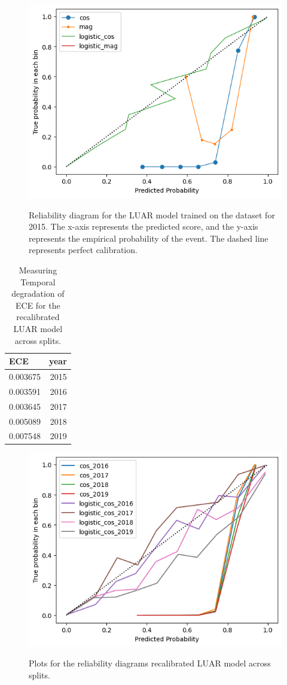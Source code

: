 \begin{figure}
    \centering
    \includegraphics[width=0.7\linewidth,alt={Line plots showing reliability diagram comparisons.}]{stylometryExtensions/figures/calibration_expts/calibrate_2015.png}
    \caption{Reliability diagram for the LUAR model trained on the \DSvarydelta{} dataset for 2015. The x-axis represents the predicted score, and the y-axis represents the empirical probability of the event. The dashed line represents perfect calibration.}
    \label{fig:calibration:relaibility_2015}
\end{figure}

\begin{table}[]
\centering
\begin{tabular}{lr}
\toprule
 ECE  & year \\
\midrule
  0.003675 &2015 \\
  0.003591 &2016 \\
  0.003645 &2017 \\
  0.005089 &2018 \\
  0.007548 &2019 \\
 \bottomrule
\end{tabular}
    \caption{Measuring Temporal degradation of ECE for the recalibrated LUAR model across \DSvarydelta{} splits.}
    \label{tab:calib:init}
\end{table}

\begin{figure}
    \centering
    \includegraphics[width=0.8\linewidth,alt={Line plot for reliability diagram of LUAR over time.}]{stylometryExtensions/figures/calibration_expts/eval_calibration.png}
    \caption{Plots for the reliability diagrams recalibrated LUAR model across \DSvarydelta{} splits.}
    \label{fig:calibration:reliability_2016_2019}
\end{figure}

